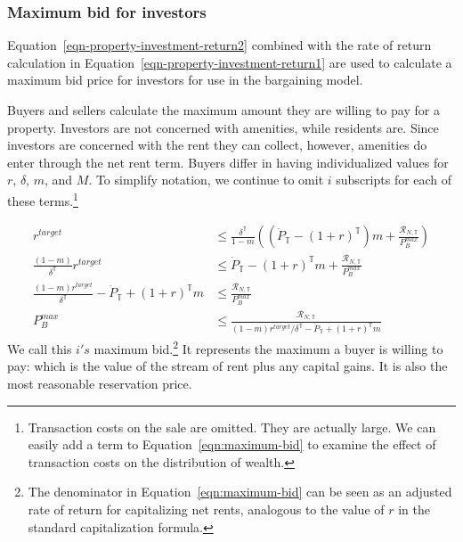 {\subsubsection{Maximum bid for investors}
Equation~\ref{eqn-property-investment-return2} combined with the rate of return calculation in Equation~\ref{eqn-property-investment-return1} are used to calculate a maximum bid price for investors for use in the bargaining model.
% 



Buyers and sellers calculate the maximum amount they are willing to pay for a property.  Investors are not concerned with amenities, while residents are. Since investors are concerned with the rent they can collect, however, amenities do enter through the net rent term. Buyers differ in having individualized values for $r$, $\delta$, $m$, and $M$. To simplify notation, we continue to omit  $i$ subscripts for each of these terms.\footnote{Transaction costs on the sale are omitted. They are actually large. We can easily add a term to  Equation~\ref{eqn:maximum-bid} to examine the effect of transaction costs on the distribution of wealth.}



\begin{align}
r^{target}& \le \frac{\delta^\mathbb{T}}{1-m} \left((\dot P_\mathbb{T} - (1+r)^\mathbb{T})m  + \frac{\mathcal{R}_{N, \mathbb{T}}}{P_B^{max}}\right)\nonumber\\
\frac{(1-m)}{\delta^\mathbb{T}}r^{target} &\le \dot P_\mathbb{T} - (1+r)^\mathbb{T}m  +   \frac{\mathcal{R}_{N, \mathbb{T}}}{P_B^{max}} \nonumber\\
\frac{(1-m)r^{target}}{\delta^\mathbb{T}} - \dot P_\mathbb{T} + (1+r)^\mathbb{T}m &\le  \frac{\mathcal{R}_{N, \mathbb{T}}}{P_B^{max}}\nonumber\\
P_B^{max} &\le  \frac{\mathcal{R}_{N, \mathbb{T}}}{(1-m)r^{target}/\delta^\mathbb{T} - \dot P_\mathbb{T} + (1+r)^\mathbb{T}m} \label{eqn:maximum-bid}
\end{align}
We call this  $i's$ maximum bid.\footnote{The denominator in Equation~\ref{eqn:maximum-bid} can be seen as an adjusted rate of return for capitalizing net rents, analogous to the value of $r$ in the standard capitalization formula.} 
It represents the maximum a buyer is willing to pay: which is the value of the stream of rent plus any capital gains.  It is also the most reasonable reservation price.%

}
